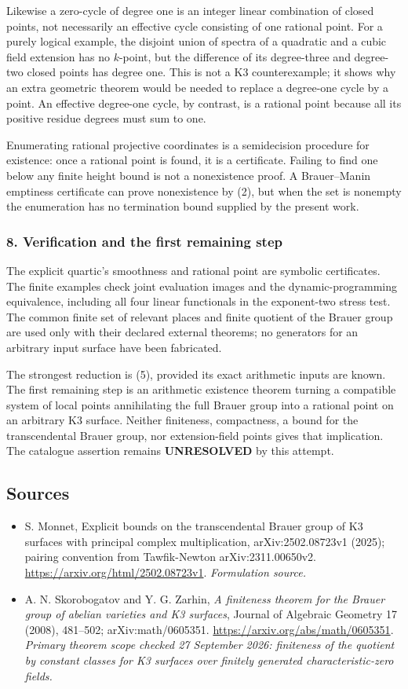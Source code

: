 \documentclass[11pt]{article}
\begin{document}
Likewise a zero-cycle of degree one is an integer linear combination of closed points, not necessarily an effective cycle consisting of one rational point. For a purely logical example, the disjoint union of spectra of a quadratic and a cubic field extension has no $k$-point, but the difference of its degree-three and degree-two closed points has degree one. This is not a K3 counterexample; it shows why an extra geometric theorem would be needed to replace a degree-one cycle by a point. An effective degree-one cycle, by contrast, is a rational point because all its positive residue degrees must sum to one.

Enumerating rational projective coordinates is a semidecision procedure for existence: once a rational point is found, it is a certificate. Failing to find one below any finite height bound is not a nonexistence proof. A Brauer--Manin emptiness certificate can prove nonexistence by (2), but when the set is nonempty the enumeration has no termination bound supplied by the present work.

\subsubsection{8. Verification and the first remaining step}
The explicit quartic's smoothness and rational point are symbolic certificates. The finite examples check joint evaluation images and the dynamic-programming equivalence, including all four linear functionals in the exponent-two stress test. The common finite set of relevant places and finite quotient of the Brauer group are used only with their declared external theorems; no generators for an arbitrary input surface have been fabricated.

The strongest reduction is (5), provided its exact arithmetic inputs are known. The first remaining step is an arithmetic existence theorem turning a compatible system of local points annihilating the full Brauer group into a rational point on an arbitrary K3 surface. Neither finiteness, compactness, a bound for the transcendental Brauer group, nor extension-field points gives that implication. The catalogue assertion remains \textbf{UNRESOLVED} by this attempt.

\subsection{Sources}
\begin{itemize}
\item[S1]S. Monnet, Explicit bounds on the transcendental Brauer group of K3 surfaces with principal complex multiplication, arXiv:2502.08723v1 (2025); pairing convention from Tawfik-Newton arXiv:2311.00650v2.
\url{https://arxiv.org/html/2502.08723v1}.
\textit{Formulation source.}
\item[E1]A. N. Skorobogatov and Y. G. Zarhin, \emph{A finiteness theorem for the Brauer group of abelian varieties and K3 surfaces}, Journal of Algebraic Geometry 17 (2008), 481--502; arXiv:math/0605351.
\url{https://arxiv.org/abs/math/0605351}.
\textit{Primary theorem scope checked 27 September 2026: finiteness of the quotient by constant classes for K3 surfaces over finitely generated characteristic-zero fields.}
\end{itemize}
\end{document}
